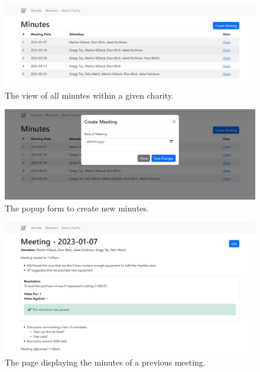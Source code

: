 \documentclass{UoYCSproject}
\begin{document}
\begin{figure}[H]
\begin{center}
\includegraphics[width=\textwidth]{"./assets/apendix/frontend-screenshots/Minutes List - Cropped.png"}
\end{center}
\caption{The view of all minutes within a given charity.}
\end{figure}

\begin{figure}[H]
\begin{center}
\includegraphics[width=\textwidth]{"./assets/apendix/frontend-screenshots/Minutes New - Cropped.png"}
\end{center}
\caption{The popup form to create new minutes.}
\end{figure}

\begin{figure}[H]
\begin{center}
\includegraphics[width=\textwidth]{"./assets/apendix/frontend-screenshots/Minutes View.png"}
\end{center}
\caption{The page displaying the minutes of a previous meeting.}
\end{figure}
\end{document}
